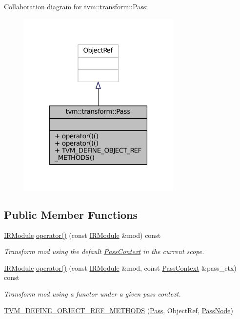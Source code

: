 Collaboration diagram for tvm\+:\+:transform\+:\+:Pass\+:
\nopagebreak
\begin{figure}[H]
\begin{center}
\leavevmode
\includegraphics[width=230pt]{classtvm_1_1transform_1_1Pass__coll__graph}
\end{center}
\end{figure}
\subsection*{Public Member Functions}
\begin{DoxyCompactItemize}
\item 
\hyperlink{classtvm_1_1IRModule}{I\+R\+Module} \hyperlink{classtvm_1_1transform_1_1Pass_a3894c4af152ad0618323d20d21ef631d}{operator()} (const \hyperlink{classtvm_1_1IRModule}{I\+R\+Module} \&mod) const 
\begin{DoxyCompactList}\small\item\em Transform mod using the default \hyperlink{classtvm_1_1transform_1_1PassContext}{Pass\+Context} in the current scope. \end{DoxyCompactList}\item 
\hyperlink{classtvm_1_1IRModule}{I\+R\+Module} \hyperlink{classtvm_1_1transform_1_1Pass_aeb29f2d1519ba3611ad8dbeb03b65245}{operator()} (const \hyperlink{classtvm_1_1IRModule}{I\+R\+Module} \&mod, const \hyperlink{classtvm_1_1transform_1_1PassContext}{Pass\+Context} \&pass\+\_\+ctx) const 
\begin{DoxyCompactList}\small\item\em Transform mod using a functor under a given pass context. \end{DoxyCompactList}\item 
\hyperlink{classtvm_1_1transform_1_1Pass_a7b4c24b01a5e8b2da636d7267890f906}{T\+V\+M\+\_\+\+D\+E\+F\+I\+N\+E\+\_\+\+O\+B\+J\+E\+C\+T\+\_\+\+R\+E\+F\+\_\+\+M\+E\+T\+H\+O\+DS} (\hyperlink{classtvm_1_1transform_1_1Pass}{Pass}, Object\+Ref, \hyperlink{classtvm_1_1transform_1_1PassNode}{Pass\+Node})
\end{DoxyCompactItemize}



